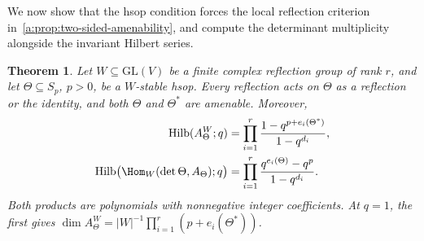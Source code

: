\documentclass[10pt,a4paper]{amsart}
\newtheorem{theorem}{Theorem}[section]
\theoremstyle{definition}
\DeclareMathOperator{\Hilb}{Hilb}\DeclareMathOperator{\Res}{Res}
\begin{document}
We now show that the hsop condition forces the local reflection
criterion in~\cref{a:prop:two-sided-amenability}, and compute the
determinant multiplicity alongside the invariant Hilbert series.

\begin{theorem}\label{a:thm:automatic}\label{c:prop:hilbert}\label{cor:products}
Let $W\subseteq\mathrm{GL}(V)$ be a finite complex reflection group of
rank $r$, and let $\Theta\subseteq S_p$, $p>0$, be a $W$-stable hsop.
Every reflection acts on $\Theta$ as a reflection or the
identity, and both $\Theta$ and $\Theta^*$ are amenable. Moreover,
\begin{align}
 \Hilb(A_\Theta^W;q)
 &=\prod_{i=1}^r\frac{1-q^{p+e_i(\Theta^*)}}{1-q^{d_i}},\label{a:eq:product}\\
 \Hilb\bigl(\Hom_W(\det\Theta,A_\Theta);q\bigr)
 &=\prod_{i=1}^r\frac{q^{e_i(\Theta)}-q^p}{1-q^{d_i}}.\label{c:eq:det-hilbert}
\end{align}
Both products are polynomials with nonnegative integer coefficients. At
$q=1$, the first gives
$\dim A_\Theta^W=|W|^{-1}\prod_{i=1}^r(p+e_i(\Theta^*))$.
\end{theorem}
\end{document}

